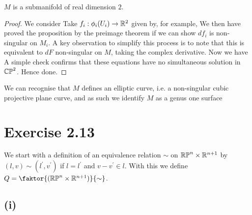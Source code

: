 \documentclass{article}
\begin{document}
\begin{prop}
$M$ is a submanifold of real dimension $2$. 
\end{prop}
\begin{proof}
We consider 
Take $f_i : \phi_i(U_i) \to \mathbb{R}^2 $ given by, for example, 
We then have proved the proposition by the preimage theorem if we can show $df_i$ is non-singular on $M_i$. A key observation to simplify this process is to note that this is equivalent to $dF$ non-singular on $M$, taking the complex derivative. Now we have 
A simple check confirms that these equations have no simultaneous solution in $\mathbb{CP}^2$. Hence done. 
\end{proof}

\begin{remark}
We can recognise that $M$ defines an elliptic curve, i.e. a non-singular cubic projective plane curve, and as such we identify $M$ as a genus one surface  
\end{remark}

\section{Exercise 2.13}
We start with a definition of an equivalence relation $\sim$ on $\mathbb{RP}^n \times \mathbb{R}^{n+1}$ by $(l,v) \sim (l^\prime, v^\prime)$ if $l = l^\prime$ and $v-v^\prime \in l$. With this we define $Q = \faktor{(\mbb{RP}^n \times \mbb{R}^{n+1})}{\sim}$. 
\subsection{(i)}
\end{document}
